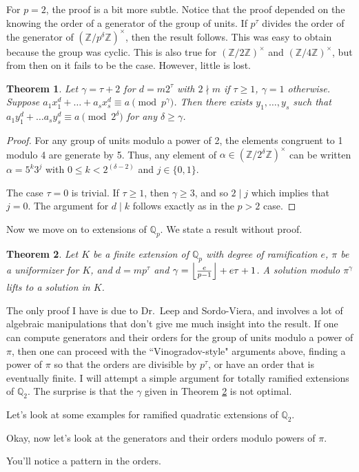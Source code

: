 \documentclass{article}
\newtheorem{theorem}{Theorem}
\DeclarePairedDelimiter\floor{\lfloor}{\rfloor}
\begin{document}
For $p=2$, the proof is a bit more subtle.  Notice that the proof depended on the knowing the order of a generator of the group of units.  If $p^{\tau}$ divides the order of the generator of $(\mathbb{Z}/p^\delta\mathbb{Z})^\times$, then the result follows. This was easy to obtain because the group was cyclic.  This is also true for $(\mathbb{Z}/2\mathbb{Z})^\times$ and $(\mathbb{Z}/4\mathbb{Z})^\times$, but from then on it fails to be the case.  However, little is lost.

\begin{theorem}
Let $\gamma = \tau + 2$ for $d=m 2^\tau$ with $2 \nmid m$ if $\tau \ge 1$, $\gamma = 1$ otherwise.  Suppose $a_1 x_1^d + \ldots + a_s x_s^d \equiv a \pmod{p^\gamma}$.  Then there exists $y_1, \ldots, y_s$ such that $a_1 y_1^d + \ldots a_s y_s^d \equiv a \pmod{2^\delta}$ for any $\delta \ge \gamma$.
\end{theorem}

\begin{proof}
For any group of units modulo a power of 2, the elements congruent to 1 modulo 4 are generate by 5.  Thus, any element of $\alpha \in (\mathbb{Z}/2^\delta\mathbb{Z})^\times$ can be written $\alpha = 5^k 3^j$ with $0 \le k < 2^{(\delta-2)}$ and $j \in \{0,1\}$.

The case $\tau = 0$ is trivial.  If $\tau \ge 1$, then $\gamma \ge 3$, and so $2 \mid j$ which implies that $j=0$.  The argument for $d \mid k$ follows exactly as in the $p > 2$ case.
\end{proof}

Now we move on to extensions of $\mathbb{Q}_p$.  We state a result without proof.

\begin{theorem}\label{leep}
Let $K$ be a finite extension of $\mathbb{Q}_p$ with degree of ramification $e$, $\pi$ be a uniformizer for $K$, and $d=m p^\tau$ and $\gamma = \floor*{\frac{e}{p-1}} + e\tau + 1$.  A solution modulo $\pi^\gamma$ lifts to a solution in $K$.
\end{theorem}

The only proof I have is due to Dr.\ Leep and Sordo-Viera, and involves a lot of algebraic manipulations that don't give me much insight into the result.  If one can compute generators and their orders for the group of units modulo a power of $\pi$, then one can proceed with the ``Vinogradov-style" arguments above, finding a power of $\pi$ so that the orders are divisible by $p^\tau$, or have an order that is eventually finite.  I will attempt a simple argument for totally ramified extensions of $\mathbb{Q}_2$.  The surprise is that the $\gamma$ given in Theorem \ref{leep} is not optimal.

Let's look at some examples for ramified quadratic extensions of $\mathbb{Q}_2$.

Okay, now let's look at the generators and their orders modulo powers of $\pi$.

You'll notice a pattern in the orders.
\end{document}
